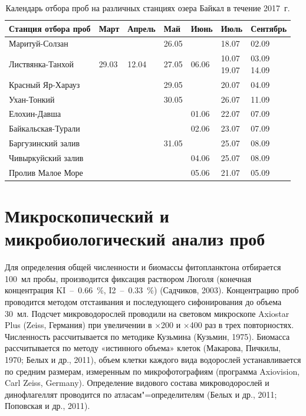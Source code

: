 \documentclass[a4paper,12pt,openany,final]{extreport}
\newcommand\theyear{2017}
\newcommand\MA[2]{{\sffamily\color{red}\hsmash{$\uparrow$}%
  \smash{\toplap{#1}{\scriptsize\bfseries #2}}}}
\def\oldcaption{} \let\oldcaption=\caption
\def\caption{\stepcounter{captionsnum}\oldcaption}
\renewcommand\MA[2]{}
\begin{document}
\begin{table}[h!]
\caption{Календарь отбора проб на различных станциях озера Байкал в
течение \theyear~г.}\label{table:1}
\begin{center}
{\small%
\begin{tabular}{|l|l|l|l|l|l|l|}
  \hline
\rm Станция отбора проб & Март & Апрель & Май & Июнь & Июль &
                                                          Сентябрь\tabularnewline
                                                          \hline
Маритуй-Солзан & & & 26.05 & & 18.07 & 02.09\tabularnewline
Листвянка-Танхой &
29.03 &
12.04 &
27.05 &
06.06 &
\makecell[tl]{10.07\\
19.07}&
\makecell[tl]{03.09\\
14.09}\tabularnewline
Красный Яр-Харауз  & & & 29.05 & & 20.07 & 04.09\tabularnewline
Ухан-Тонкий        & & & 30.05 & & 26.07 & 11.09\tabularnewline
Елохин-Давша       & & & & 01.06 & 22.07 & 07.09\tabularnewline
Байкальская-Турали & & & & 02.06 & 23.07 & 07.09\tabularnewline
Баргузинский  залив  & & & 31.05 & & 25.07 & 08.09\tabularnewline
Чивыркуйский залив & & & & 04.06 & 25.07 & 08.09\tabularnewline
Пролив Малое Море  & & & & 05.06 & 21.07 & 05.09\tabularnewline
\hline
\end{tabular}%
}
\end{center}
\end{table}

\section{Микроскопический и микробиологический анализ проб}

Для определения общей численности и биомассы фитопланктона отбирается 100~мл пробы, производится фиксация раствором Люголя (конечная концентрация KI~--~0.66~\%, I2~--~0.33~\%) (Садчиков, 2003). Концентрацию\MA{r}{Не понятно, что делается с концентрацией?} проб проводится методом отстаивания и последующего сифонирования до объема 30~мл. Подсчет микроводорослей проводили на световом микроскопе Axiostar Plus (Zeiss, Германия) при увеличении в ×200 и ×400 раз в трех повторностях. Численность рассчитывается по методике Кузьмина (Кузьмин, 1975). Биомасса рассчитывается по методу «истинного объема» клеток (Макарова, Пичкилы, 1970; Белых и др., 2011), объем клетки каждого вида водорослей устанавливается по средним размерам, измеренным по микрофотографиям (программа Axiovision, Carl Zeiss, Germany). Определение видового состава микроводорослей и динофлагеллят проводится по атласам"=определителям (Белых и др., 2011; Поповская и др., 2011).
\end{document}
